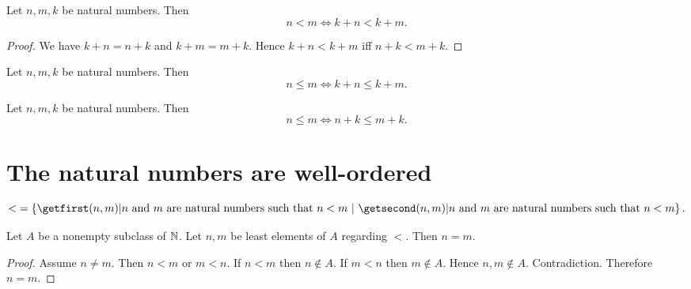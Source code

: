 \documentclass[../arithmetic.tex]{subfiles}
\begin{document}
  \begin{forthel}
    \begin{corollary}
      Let $n, m, k$ be natural numbers.
      Then \[ n < m \iff k + n < k + m. \]
    \end{corollary}
    \begin{proof}
      We have $k + n = n + k$ and $k + m = m + k$.
      Hence $k + n < k + m$ iff $n + k < m + k$.
    \end{proof}
  \end{forthel}

  \begin{forthel}
    \begin{corollary}
      Let $n, m, k$ be natural numbers.
      Then \[ n \leq m \iff k + n \leq k + m. \]
    \end{corollary}
  \end{forthel}

  \begin{forthel}
    \begin{corollary}
      Let $n, m, k$ be natural numbers.
      Then \[ n \leq m \iff n + k \leq m + k. \]
    \end{corollary}
  \end{forthel}


  \section{The natural numbers are well-ordered}

  \begin{forthel}
    \begin{definition}
      \[ {<} = \class{(n, m) | \text{$n$ and $m$ are natural numbers such that
      $n < m$}}. \]
    \end{definition}
  \end{forthel}

  \begin{forthel}
    \begin{proposition}
      Let $A$ be a nonempty subclass of $\mathbb{N}$.
      Let $n, m$ be least elements of $A$ regarding ${<}$.
      Then $n = m$.
    \end{proposition}
    \begin{proof}
      Assume $n \neq m$.
      Then $n < m$ or $m < n$.
      If $n < m$ then $n \notin A$.
      If $m < n$ then $m \notin A$.
      Hence $n, m \notin A$.
      Contradiction.
      Therefore $n = m$.
    \end{proof}
  \end{forthel}
\end{document}

